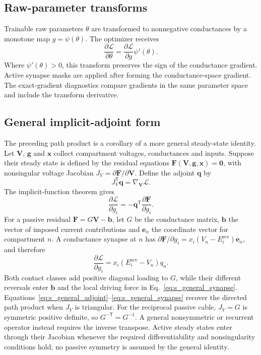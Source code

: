 \subsection{Raw-parameter transforms}

Trainable raw parameters $\theta$ are transformed to nonnegative conductances
by a monotone map $g=\psi(\theta)$. The optimizer receives
\begin{equation}
\frac{\partial\mathcal L}{\partial\theta}
=\frac{\partial\mathcal L}{\partial g}\psi'(\theta).
\end{equation}
Where $\psi'(\theta)>0$, this transform preserves the sign of the
conductance gradient. Active synapse masks are applied after forming the
conductance-space gradient. The exact-gradient diagnostics compare gradients
in the same parameter space and include the transform derivative.

\subsection{General implicit-adjoint form}

The preceding path product is a corollary of a more general steady-state
identity. Let $\bm V$, $\bm g$ and $\bm x$ collect compartment voltages,
conductances and inputs. Suppose their steady state is defined by the
residual equations $\bm F(\bm V,\bm g,\bm x)=\bm 0$, with nonsingular
voltage Jacobian $J_V=\partial\bm F/\partial\bm V$. Define the adjoint
$\bm q$ by
\begin{equation}
J_V^{\mathsf T}\bm q=\nabla_{\bm V}\mathcal L.
\label{eq:s_general_adjoint}
\end{equation}
The implicit-function theorem gives
\begin{equation}
\frac{\partial\mathcal L}{\partial g_i}
=-\bm q^{\mathsf T}\frac{\partial\bm F}{\partial g_i}.
\label{eq:s_general_gradient}
\end{equation}
For a passive residual $\bm F=G\bm V-\bm b$, let $G$ be the conductance
matrix, $\bm b$ the vector of imposed current contributions and $\bm e_n$
the coordinate vector for compartment $n$. A conductance synapse at $n$ has
$\partial\bm F/\partial g_i=x_i(V_n-E_i^{\mathrm{rev}})\bm e_n$, and therefore
\begin{equation}
\frac{\partial\mathcal L}{\partial g_i}
=x_i(E_i^{\mathrm{rev}}-V_n)q_n.
\label{eq:s_general_synapse}
\end{equation}
Both contact classes add positive diagonal loading to \(G\), while their
different reversals enter \(\bm b\) and the local driving force in
Eq.~\ref{eq:s_general_synapse}.
Equations~\ref{eq:s_general_adjoint}--\ref{eq:s_general_synapse} recover the
directed path product when $J_V$ is triangular. For the reciprocal passive
cable, $J_V=G$ is symmetric positive definite, so
$G^{-\mathsf T}=G^{-1}$. A general nonsymmetric or recurrent operator instead
requires the inverse transpose. Active steady states enter through their
Jacobian whenever the required differentiability and nonsingularity conditions
hold; no passive symmetry is assumed by the general identity.

